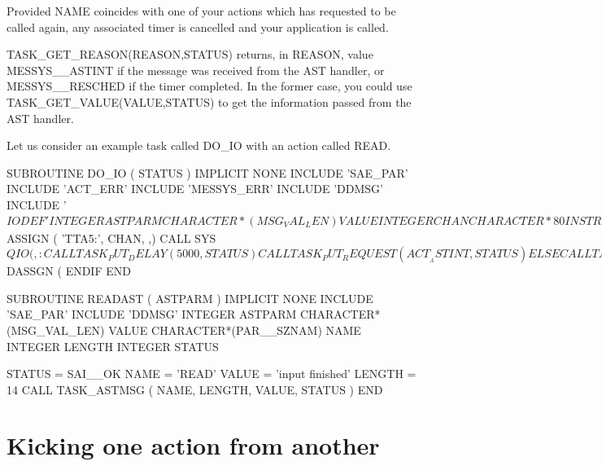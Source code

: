 \documentclass[twoside,11pt,nolof]{starlink}
\begin{document}
Provided NAME coincides with one of your actions which has requested to be
called again, any associated timer is cancelled and your application is called.

TASK\_GET\_REASON(REASON,STATUS) returns, in REASON, value
MESSYS\_\_ASTINT if the message was received from the AST handler,
or MESSYS\_\-\_\-RESCHED if the timer completed.
In the former case, you could use
TASK\_GET\_VALUE(VALUE,STATUS) to get the information passed from the AST
handler.

Let us consider an example task called DO\_IO with an action called READ.


\begin{small}
\begin{terminalv}
      SUBROUTINE DO_IO ( STATUS )
      IMPLICIT NONE
      INCLUDE 'SAE_PAR'
      INCLUDE 'ACT_ERR'
      INCLUDE 'MESSYS_ERR'
      INCLUDE 'DDMSG'
      INCLUDE '$IODEF'
      INTEGER ASTPARM
      CHARACTER*(MSG_VAL_LEN) VALUE
      INTEGER CHAN
      CHARACTER*80 INSTRING
      INTEGER REASON
      INTEGER STATUS
      INTEGER SEQ
      EXTERNAL READAST

      IF ( STATUS .NE. SAI__OK ) RETURN
      CALL TASK_GET_SEQ( SEQ, STATUS )
      IF ( SEQ .EQ. 0 ) THEN
         CALL SYS$ASSIGN ( 'TTA5:', CHAN, ,)
         CALL SYS$QIO ( , %
     :     %
         CALL TASK_PUT_DELAY ( 5000, STATUS )
         CALL TASK_PUT_REQUEST ( ACT__ASTINT, STATUS )
      ELSE
         CALL TASK_GET_REASON ( REASON, STATUS )
         IF ( REASON .EQ. MESSYS__ASTINT ) THEN
            CALL TASK_GET_VALUE ( VALUE, STATUS )
            CALL MSG_OUT ( ' ', VALUE, STATUS )
         ELSE IF ( REASON .EQ. MESSYS__RESCHED ) THEN
            CALL MSG_OUT ( ' ', 'timed-out', STATUS )
         ENDIF
         CALL SYS$DASSGN ( %
      ENDIF
      END

      SUBROUTINE READAST ( ASTPARM )
      IMPLICIT NONE
      INCLUDE 'SAE_PAR'
      INCLUDE 'DDMSG'
      INTEGER ASTPARM
      CHARACTER*(MSG_VAL_LEN) VALUE
      CHARACTER*(PAR__SZNAM) NAME
      INTEGER LENGTH
      INTEGER STATUS

      STATUS = SAI__OK
      NAME = 'READ'
      VALUE = 'input finished'
      LENGTH = 14
      CALL TASK_ASTMSG ( NAME, LENGTH, VALUE, STATUS )
      END
\end{terminalv}
\end{small}

\section{Kicking one action from another
}
\end{document}
